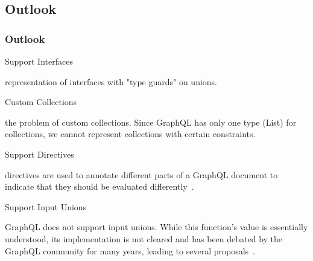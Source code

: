 \subsection{Outlook}
\begin{frame}\frametitle{Outlook}

\begin{block}{Support Interfaces}

    representation of interfaces with "type guards" on unions. 

\end{block}




\begin{block}{Custom Collections}

the problem of custom collections. Since GraphQL has only one type (List) for collections, we cannot represent collections with certain constraints. 

\end{block}

\begin{block}{Support Directives} 

directives are used to annotate different parts of a GraphQL document to indicate that they should be evaluated differently~\cite{gql-spec}. 

\end{block}

\begin{block}{Support Input Unions} 

GraphQL does not support input unions. While this function's value is essentially understood, its implementation is not cleared and has been debated by the GraphQL community for many years, leading to several proposals~\cite{gql-spec-input-unions}. 

\end{block}

\end{frame}
